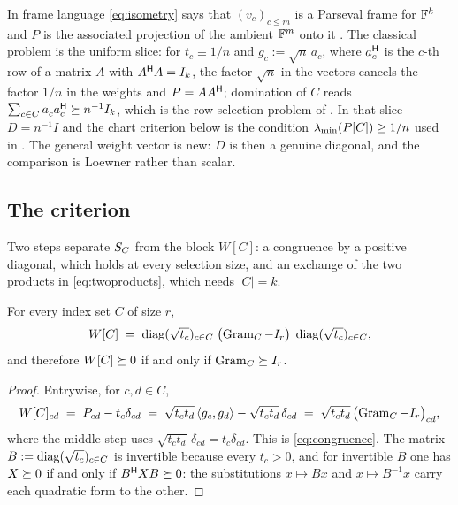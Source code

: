 \begin{remark}\label{rem:frames}
In frame language \eqref{eq:isometry} says that $(v_c)_{c\le m}$ is a
Parseval frame for $\mathbb{F}^k$ and $P$ is the associated projection of the
ambient $\mathbb{F}^m$ onto it \cite{CasazzaKutyniok2013}.  The classical
problem is the uniform slice: for $t_c\equiv1/n$ and $g_c:=\sqrt n\,a_c$,
where $a_c^{\mathsf{H}}$ is the $c$-th row of a matrix $A$ with $A^{\mathsf{H}} A=I_k$, the
factor $\sqrt n$ in the vectors cancels the factor $1/n$ in the weights
and $P=AA^{\mathsf{H}}$; domination of $C$ reads
$\sum_{c\in C}a_c^{\vphantom{\mathsf{H}}}a_c\adj\psd n^{-1}I_k$, which is the
row-selection problem of \cite{GTZ1997}.  In
that slice $D=n^{-1}I$ and the chart criterion below is the condition
$\lambda_{\min}(P[C])\ge1/n$ used in \cite{Nesterenko2023,Nesterenko2025}.  The
general weight vector is new: $D$ is then a genuine diagonal, and the
comparison is Loewner rather than scalar.
\end{remark}

\subsection{The criterion}\label{sec:criterion}

Two steps separate $S_{C}$ from the block $W[C]$: a congruence by a
positive diagonal, which holds at every selection size, and an exchange
of the two products in \eqref{eq:twoproducts}, which needs
$\lvert C\rvert=k$.

\begin{lemma}[Lean]\label{lem:congruence}
For every index set $C$ of size $r$,
\begin{equation}\label{eq:congruence}
  W[C]\;=\;\operatorname{diag}(\sqrt{t_c})_{c\in C}\;
  \bigl(\operatorname{Gram}_C-I_r\bigr)\;\operatorname{diag}(\sqrt{t_c})_{c\in C},
\end{equation}
and therefore $W[C]\succeq0$ if and only if $\operatorname{Gram}_C\succeq I_r$.
\end{lemma}

\begin{proof}
Entrywise, for $c,d\in C$,
\[
  W[C]_{cd}
  \;=\;P_{cd}-t_c\delta_{cd}
  \;=\;\sqrt{t_ct_d}\,\langle g_c,g_d\rangle-\sqrt{t_ct_d}\,\delta_{cd}
  \;=\;\sqrt{t_ct_d}\,\bigl(\operatorname{Gram}_C-I_r\bigr)_{cd},
\]
where the middle step uses $\sqrt{t_ct_d}\,\delta_{cd}=t_c\delta_{cd}$.
This is \eqref{eq:congruence}.  The matrix $B:=\operatorname{diag}(\sqrt{t_c})_{c\in C}$
is invertible because every $t_c>0$, and for invertible $B$ one has
$X\succeq0$ if and only if $B^{\mathsf{H}} XB\succeq0$: the substitutions $x\mapsto Bx$
and $x\mapsto B^{-1}x$ carry each quadratic form to the other.
\end{proof}

